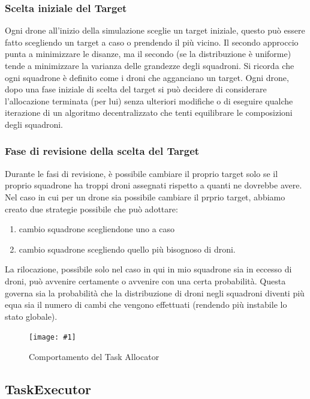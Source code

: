 \documentclass[a4paper,11pt,oneside, table]{article}
\newcommand{\putimage}[4] {
	\begin{figure}[H]
	    \centering
	    \texttt{[image: \#1]}
	    \caption{#2}\label{#3}
	\end{figure}
}
\begin{document}
\subsubsection{Scelta iniziale del Target}

Ogni drone all'inizio della simulazione sceglie un target iniziale, questo pu\`o essere fatto scegliendo un target a caso o prendendo il pi\`u vicino.
Il secondo approccio punta a minimizzare le disanze, ma il secondo (se la distribuzione \`e uniforme) tende a minimizzare la varianza delle grandezze degli squadroni.
Si ricorda che ogni squadrone \`e definito come i droni che agganciano un target.
Ogni drone, dopo una fase iniziale di scelta del target si pu\`o decidere di considerare l'allocazione terminata (per lui) senza ulteriori modifiche o di eseguire qualche iterazione di un algoritmo decentralizzato che tenti equilibrare le composizioni degli squadroni. 

\subsubsection{Fase di revisione della scelta del Target}

Durante le fasi di revisione, è possibile cambiare il proprio target solo se il proprio squadrone ha troppi droni assegnati rispetto a quanti ne dovrebbe avere.
Nel caso in cui per un drone sia possibile cambiare il prprio target, abbiamo creato due  strategie possibile che può adottare:
\begin{enumerate}
    \item cambio squadrone scegliendone uno a caso
    \item cambio squadrone scegliendo quello più bisognoso di droni.
\end{enumerate}

La rilocazione, possibile solo nel caso in qui in mio squadrone sia in eccesso di droni,  pu\`o avvenire certamente o avvenire con una certa probabilit\`a. Questa governa sia la probabilit\`a che la distribuzione di droni negli squadroni diventi pi\`u equa sia il numero di cambi che vengono effettuati (rendendo pi\`u instabile lo stato globale).

\putimage{images/task-allocator.png}{Comportamento del Task Allocator}{png:task-allocator}{0.99}

\subsection{TaskExecutor}
\end{document}
